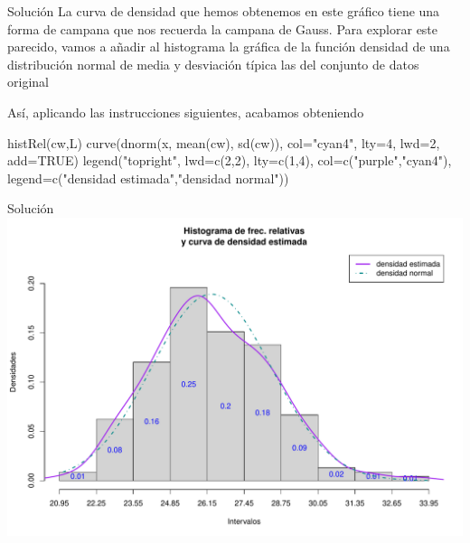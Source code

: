 \documentclass[
  ignorenonframetext,
  aspectratio=169]{beamer}
\newenvironment{Shaded}{\begin{snugshade}}{\end{snugshade}}
\newcommand{\AttributeTok}[1]{\textcolor[rgb]{0.77,0.63,0.00}{#1}}
\newcommand{\ConstantTok}[1]{\textcolor[rgb]{0.00,0.00,0.00}{#1}}
\newcommand{\DecValTok}[1]{\textcolor[rgb]{0.00,0.00,0.81}{#1}}
\newcommand{\FunctionTok}[1]{\textcolor[rgb]{0.00,0.00,0.00}{#1}}
\newcommand{\NormalTok}[1]{#1}
\newcommand{\StringTok}[1]{\textcolor[rgb]{0.31,0.60,0.02}{#1}}
\begin{document}
\begin{frame}[fragile]{Solución}
\protect\hypertarget{soluciuxf3n-46}{}
La curva de densidad que hemos obtenemos en este gráfico tiene una forma
de campana que nos recuerda la campana de Gauss. Para explorar este
parecido, vamos a añadir al histograma la gráfica de la función densidad
de una distribución normal de media y desviación típica las del conjunto
de datos original

Así, aplicando las instrucciones siguientes, acabamos obteniendo

\begin{Shaded}
\begin{Highlighting}[]
\FunctionTok{histRel}\NormalTok{(cw,L)}
\FunctionTok{curve}\NormalTok{(}\FunctionTok{dnorm}\NormalTok{(x, }\FunctionTok{mean}\NormalTok{(cw), }\FunctionTok{sd}\NormalTok{(cw)), }\AttributeTok{col=}\StringTok{"cyan4"}\NormalTok{, }\AttributeTok{lty=}\DecValTok{4}\NormalTok{, }\AttributeTok{lwd=}\DecValTok{2}\NormalTok{,}
\AttributeTok{add=}\ConstantTok{TRUE}\NormalTok{)}
\FunctionTok{legend}\NormalTok{(}\StringTok{"topright"}\NormalTok{, }\AttributeTok{lwd=}\FunctionTok{c}\NormalTok{(}\DecValTok{2}\NormalTok{,}\DecValTok{2}\NormalTok{), }\AttributeTok{lty=}\FunctionTok{c}\NormalTok{(}\DecValTok{1}\NormalTok{,}\DecValTok{4}\NormalTok{), }\AttributeTok{col=}\FunctionTok{c}\NormalTok{(}\StringTok{"purple"}\NormalTok{,}\StringTok{"cyan4"}\NormalTok{),}
       \AttributeTok{legend=}\FunctionTok{c}\NormalTok{(}\StringTok{"densidad estimada"}\NormalTok{,}\StringTok{"densidad normal"}\NormalTok{))}
\end{Highlighting}
\end{Shaded}
\end{frame}

\begin{frame}{Solución}
\protect\hypertarget{soluciuxf3n-47}{}
\includegraphics{Hora6_files/figure-beamer/unnamed-chunk-65-1.pdf}
\end{frame}
\end{document}
